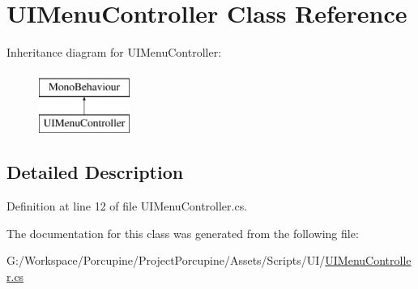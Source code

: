 \hypertarget{class_u_i_menu_controller}{}\section{U\+I\+Menu\+Controller Class Reference}
\label{class_u_i_menu_controller}
Inheritance diagram for U\+I\+Menu\+Controller\+:\begin{figure}[H]
\begin{center}
\leavevmode
\includegraphics[height=2.000000cm]{class_u_i_menu_controller}
\end{center}
\end{figure}


\subsection{Detailed Description}


Definition at line 12 of file U\+I\+Menu\+Controller.\+cs.



The documentation for this class was generated from the following file\+:\begin{DoxyCompactItemize}
\item 
G\+:/\+Workspace/\+Porcupine/\+Project\+Porcupine/\+Assets/\+Scripts/\+U\+I/\hyperlink{_u_i_menu_controller_8cs}{U\+I\+Menu\+Controller.\+cs}\end{DoxyCompactItemize}
